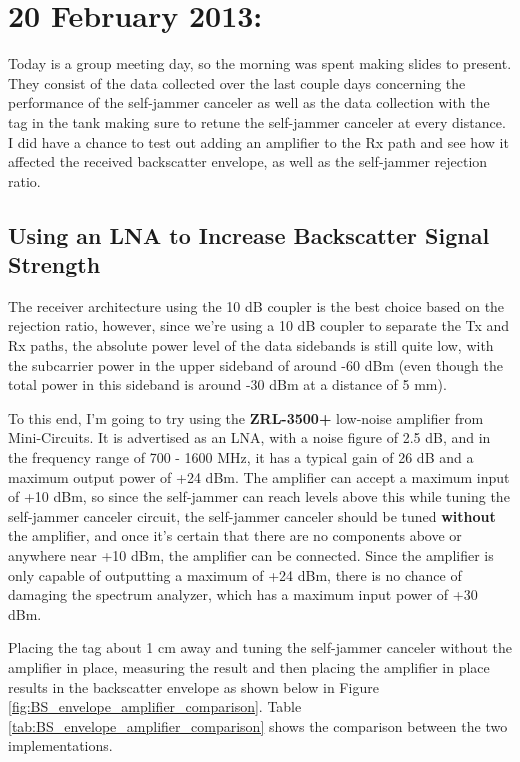 \documentclass[12pt,onecolumn,titlepage]{article}
\begin{document}
\clearpage
\section{20 February 2013:}

\indent \indent Today is a group meeting day, so the morning was spent making slides to present. They consist of the data collected over the last couple days concerning the performance of the self-jammer canceler as well as the data collection with the tag in the tank making sure to retune the self-jammer canceler at every distance. I did have a chance to test out adding an amplifier to the Rx path and see how it affected the received backscatter envelope, as well as the self-jammer rejection ratio.

\subsection{Using an LNA to Increase Backscatter Signal Strength}
\indent \indent The receiver architecture using the 10 dB coupler is the best choice based on the rejection ratio, however, since we're using a 10 dB coupler to separate the Tx and Rx paths, the absolute power level of the data sidebands is still quite low, with the subcarrier power in the upper sideband of around -60 dBm (even though the total power in this sideband is around -30 dBm at a distance of 5 mm). 

To this end, I'm going to try using the {\textbf{ZRL-3500+}} low-noise amplifier from Mini-Circuits. It is advertised as an LNA, with a noise figure of 2.5 dB, and in the frequency range of 700 - 1600 MHz, it has a typical gain of 26 dB and a maximum output power of +24 dBm. The amplifier can accept a maximum input of +10 dBm, so since the self-jammer can reach levels above this while tuning the self-jammer canceler circuit, the self-jammer canceler should be tuned {\textbf{without}} the amplifier, and once it's certain that there are no components above or anywhere near +10 dBm, the amplifier can be connected. Since the amplifier is only capable of outputting a maximum of +24 dBm, there is no chance of damaging the spectrum analyzer, which has a maximum input power of +30 dBm.

Placing the tag about 1 cm away and tuning the self-jammer canceler without the amplifier in place, measuring the result and then placing the amplifier in place results in the backscatter envelope as shown below in Figure \ref{fig:BS_envelope_amplifier_comparison}. Table \ref{tab:BS_envelope_amplifier_comparison} shows the comparison between the two implementations.
\end{document}
